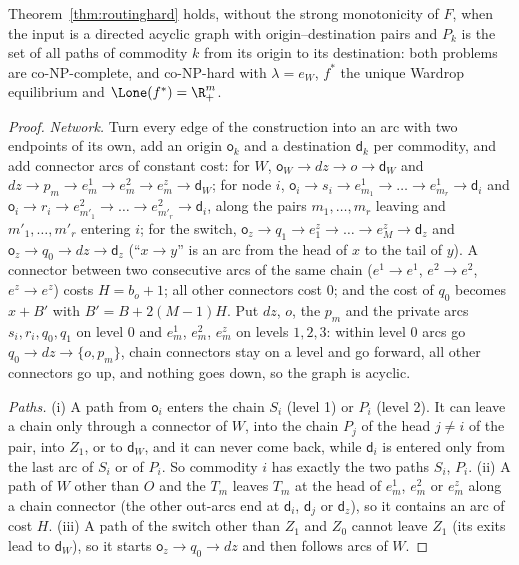 \begin{corollary}\label{cor:routingdag}
Theorem~\ref{thm:routinghard} holds, without the strong monotonicity of $F$, when the input is a directed acyclic graph with origin--destination pairs and $P_k$ is the set of all paths of commodity $k$ from its origin to its destination: both problems are co-NP-complete, and co-NP-hard with $\lambda=e_W$, $f^*$ the unique Wardrop equilibrium and $\Lone(f^*)=\R^m_+$. 
\end{corollary}
\begin{proof}
\emph{Network.} Turn every edge of the construction into an arc with two endpoints of its own, add an origin $\mathsf o_k$ and a destination $\mathsf d_k$ per commodity, and add connector arcs of constant cost: for $W$, $\mathsf o_W\to dz\to o\to\mathsf d_W$ and $dz\to p_m\to e^1_m\to e^2_m\to e^z_m\to\mathsf d_W$; for node $i$, $\mathsf o_i\to s_i\to e^1_{m_1}\to\dots\to e^1_{m_r}\to\mathsf d_i$ and $\mathsf o_i\to r_i\to e^2_{m'_1}\to\dots\to e^2_{m'_r}\to\mathsf d_i$, along the pairs $m_1,\dots,m_r$ leaving and $m'_1,\dots,m'_r$ entering $i$; for the switch, $\mathsf o_z\to q_1\to e^z_{1}\to\dots\to e^z_{M}\to\mathsf d_z$ and $\mathsf o_z\to q_0\to dz\to\mathsf d_z$ (``$x\to y$'' is an arc from the head of $x$ to the tail of $y$). A connector between two consecutive arcs of the same chain ($e^1\to e^1$, $e^2\to e^2$, $e^z\to e^z$) costs $H=b_o+1$; all other connectors cost $0$; and the cost of $q_0$ becomes $x+B'$ with $B'=B+2(M-1)H$. Put $dz$, $o$, the $p_m$ and the private arcs $s_i,r_i,q_0,q_1$ on level $0$ and $e^1_m$, $e^2_m$, $e^z_m$ on levels $1,2,3$: within level $0$ arcs go $q_0\to dz\to\{o,p_m\}$, chain connectors stay on a level and go forward, all other connectors go up, and nothing goes down, so the graph is acyclic.

\emph{Paths.} (i) A path from $\mathsf o_i$ enters the chain $S_i$ (level 1) or $P_i$ (level 2). It can leave a chain only through a connector of $W$, into the chain $P_j$ of the head $j\ne i$ of the pair, into $Z_1$, or to $\mathsf d_W$, and it can never come back, while $\mathsf d_i$ is entered only from the last arc of $S_i$ or of $P_i$. So commodity $i$ has exactly the two paths $S_i$, $P_i$. (ii) A path of $W$ other than $O$ and the $T_m$ leaves $T_m$ at the head of $e^1_m$, $e^2_m$ or $e^z_m$ along a chain connector (the other out-arcs end at $\mathsf d_i$, $\mathsf d_j$ or $\mathsf d_z$), so it contains an arc of cost $H$. (iii) A path of the switch other than $Z_1$ and $Z_0$ cannot leave $Z_1$ (its exits lead to $\mathsf d_W$), so it starts $\mathsf o_z\to q_0\to dz$ and then follows arcs of $W$.


\end{proof}
